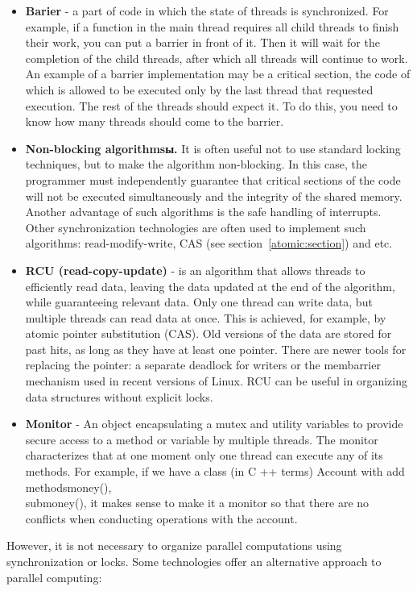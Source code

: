 {\begin{itemize}
			\item\textbf{Barier} - a part of code in which the state of threads is synchronized. For example, if a function in the main thread requires all child threads to finish their work, you can put a barrier in front of it. Then it will wait for the completion of the child threads, after which all threads will continue to work. An example of a barrier implementation may be a critical section, the code of which is allowed to be executed only by the last thread that requested execution. The rest of the threads should expect it. To do this, you need to know how many threads should come to the barrier.
			\item\textbf{Non-blocking algorithmsы.} It is often useful not to use standard locking techniques, but to make the algorithm non-blocking. In this case, the programmer must independently guarantee that critical sections of the code will not be executed simultaneously and the integrity of the shared memory. Another advantage of such algorithms is the safe handling of interrupts. Other synchronization technologies are often used to implement such algorithms: read-modify-write, CAS (see section~\ref{atomic:section}) and etc.
			\item\textbf{RCU (read-copy-update)} - is an algorithm that allows threads to efficiently read data, leaving the data updated at the end of the algorithm, while guaranteeing relevant data. Only one thread can write data, but multiple threads can read data at once. This is achieved, for example, by atomic pointer substitution (CAS). Old versions of the data are stored for past hits, as long as they have at least one pointer. There are newer tools for replacing the pointer: a separate deadlock for writers or the membarrier mechanism used in recent versions of Linux. RCU can be useful in organizing data structures without explicit locks.
			\item\textbf{Monitor} - An object encapsulating a mutex and utility variables to provide secure access to a method or variable by multiple threads. The monitor characterizes that at one moment only one thread can execute any of its methods. For example, if we have a class (in C ++ terms) Account with add methods\textunderscore money(),\\sub\textunderscore money(), it makes sense to make it a monitor so that there are no conflicts when conducting operations with the account.
		\end{itemize}
		\par However, it is not necessary to organize parallel computations using synchronization or locks. Some technologies offer an alternative approach to parallel computing:
}
